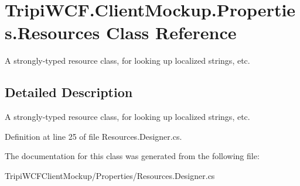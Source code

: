 \hypertarget{class_tripi_w_c_f_1_1_client_mockup_1_1_properties_1_1_resources}{
\section{TripiWCF.ClientMockup.Properties.Resources Class Reference}
\label{class_tripi_w_c_f_1_1_client_mockup_1_1_properties_1_1_resources}
}


A strongly-\/typed resource class, for looking up localized strings, etc.  


\subsection{Detailed Description}
A strongly-\/typed resource class, for looking up localized strings, etc. 

Definition at line 25 of file Resources.Designer.cs.

The documentation for this class was generated from the following file:\begin{DoxyCompactItemize}
\item 
TripiWCFClientMockup/Properties/Resources.Designer.cs\end{DoxyCompactItemize}
